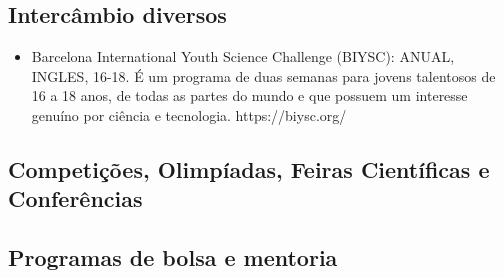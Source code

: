 \subsection{Intercâmbio diversos}

\begin{itemize}
  \item Barcelona International Youth Science Challenge (BIYSC): ANUAL, INGLES, 16-18. É um programa de duas semanas para jovens talentosos de 16 a 18 anos, de todas as partes do mundo e que possuem um interesse genuíno por ciência e tecnologia. https://biysc.org/

\end{itemize}

\subsection{Competições, Olimpíadas, Feiras Científicas e Conferências}
\subsection{Programas de bolsa e mentoria}
